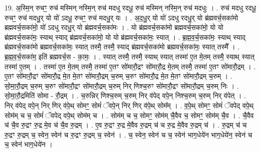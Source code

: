 \documentclass[17pt]{extarticle}
\begin{document}
19. अ॒स्मि॒न् रुचꣳ॒॒ रुच॑ मस्मिन् नस्मि॒न् रुच॑ मदधु रदधू॒ रुच॑ मस्मिन् नस्मि॒न् रुच॑ मदधुः । . रुच॑ मदधु रदधू॒ रुचꣳ॒॒ रुच॑ मदधु॒र् यो यो॑ ऽदधू॒ रुचꣳ॒॒ रुच॑ मदधु॒र् यः । . अ॒द॒धु॒र् यो यो॑ ऽदधु रदधु॒र् यो ब्र॑ह्मवर्च॒सका॑मो ब्रह्मवर्च॒सका॑मो॒ यो॑ ऽदधु रदधु॒र् यो ब्र॑ह्मवर्च॒सका॑मः । . यो ब्र॑ह्मवर्च॒सका॑मो ब्रह्मवर्च॒सका॑मो॒ यो यो ब्र॑ह्मवर्च॒सका॑मः॒ स्याथ् स्याद् ब्र॑ह्मवर्च॒सका॑मो॒ यो यो ब्र॑ह्मवर्च॒सका॑मः॒ स्यात् । . ब्र॒ह्म॒व॒र्च॒सका॑मः॒ स्याथ् स्याद् ब्र॑ह्मवर्च॒सका॑मो ब्रह्मवर्च॒सका॑मः॒ स्यात् तस्मै॒ तस्मै॒ स्याद् ब्र॑ह्मवर्च॒सका॑मो ब्रह्मवर्च॒सका॑मः॒ स्यात् तस्मै᳚ । . ब्र॒ह्म॒व॒र्च॒सका॑म॒ इति॑ ब्रह्मवर्च॒स - का॒मः॒ । . स्यात् तस्मै॒ तस्मै॒ स्याथ् स्यात् तस्मा॑ ए॒त मे॒तम् तस्मै॒ स्याथ् स्यात् तस्मा॑ ए॒तम् । . तस्मा॑ ए॒त मे॒तम् तस्मै॒ तस्मा॑ ए॒तꣳ सो॑मारौ॒द्रꣳ सो॑मारौ॒द्र मे॒तम् तस्मै॒ तस्मा॑ ए॒तꣳ सो॑मारौ॒द्रम् । . ए॒तꣳ सो॑मारौ॒द्रꣳ सो॑मारौ॒द्र मे॒त मे॒तꣳ सो॑मारौ॒द्रम् च॒रुम् च॒रुꣳ सो॑मारौ॒द्र मे॒त मे॒तꣳ सो॑मारौ॒द्रम् च॒रुम् । . सो॒मा॒रौ॒द्रम् च॒रुम् च॒रुꣳ सो॑मारौ॒द्रꣳ सो॑मारौ॒द्रम् च॒रुम् निर् णिश्च॒रुꣳ सो॑मारौ॒द्रꣳ सो॑मारौ॒द्रम् च॒रुम् निः । . सो॒मा॒रौ॒द्रमिति॑ सोमा - रौ॒द्रम् । . च॒रुन्निर् णिश्च॒रुम् च॒रुम् निर् व॑पेद् वपे॒न् निश्च॒रुम् च॒रुम् निर् व॑पेत् । . निर् व॑पेद् वपे॒न् निर् णिर् व॑पे॒थ् सोमꣳ॒॒ सोमं॑ ॅवपे॒न् निर् णिर् व॑पे॒थ् सोम᳚म् । . व॒पे॒थ् सोमꣳ॒॒ सोमं॑ ॅवपेद् वपे॒थ् सोम॑म् च च॒ सोमं॑ ॅवपेद् वपे॒थ् सोम॑म् च । . सोम॑म् च च॒ सोमꣳ॒॒ सोम॑म् चै॒वैव च॒ सोमꣳ॒॒ सोम॑म् चै॒व । . चै॒वैव च॑ चै॒व रु॒द्रꣳ रु॒द्र मे॒व च॑ चै॒व रु॒द्रम् । . ए॒व रु॒द्रꣳ रु॒द्र मे॒वैव रु॒द्रम् च॑ च रु॒द्र मे॒वैव रु॒द्रम् च॑ । . रु॒द्रम् च॑ च रु॒द्रꣳ रु॒द्रम् च॒ स्वेन॒ स्वेन॑ च रु॒द्रꣳ रु॒द्रम् च॒ स्वेन॑ । . च॒ स्वेन॒ स्वेन॑ च च॒ स्वेन॑ भाग॒धेये॑न भाग॒धेये॑न॒ स्वेन॑ च च॒ स्वेन॑ भाग॒धेये॑न । \newline
\end{document}

